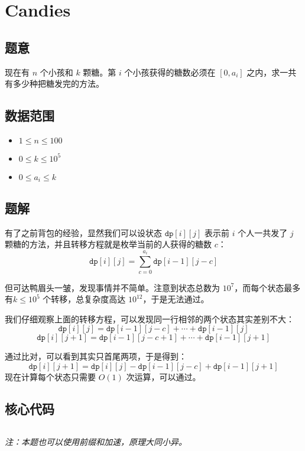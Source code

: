 \section{Candies}
\subsection*{题意}
现在有 $n$ 个小孩和 $k$ 颗糖。第 $i$ 个小孩获得的糖数必须在 $[0,a_i]$ 之内，求一共有多少种把糖发完的方法。

\subsection*{数据范围}
\begin{itemize}
\item $1 \leq n \leq 100$
\item $0 \leq k \leq 10^5$
\item $0 \leq a_i \leq k$
\end{itemize}


\subsection*{题解}

有了之前背包的经验，显然我们可以设状态 ${\texttt{dp}[i][j]}$ 表示前 $i$ 个人一共发了 $j$ 颗糖的方法，并且转移方程就是枚举当前的人获得的糖数 $c$：
$$
{\texttt{dp}[i][j]} = \sum_{c = 0}^{a_i} {\texttt{dp}[i-1][j-c]}
$$

但可达鸭眉头一皱，发现事情并不简单。注意到状态总数为 $10^7$，而每个状态最多有$k \le 10^5$ 个转移，总复杂度高达 $10^{12}$，于是无法通过。

我们仔细观察上面的转移方程，可以发现同一行相邻的两个状态其实差别不大：
$$
{\texttt{dp}[i][j]} = {\texttt{dp}[i-1][j-c]} + \cdots + {\texttt{dp}[i-1][j]}
$$
$$
{\texttt{dp}[i][j+1]} = {\texttt{dp}[i-1][j-c+1]} + \cdots + {\texttt{dp}[i-1][j+1]}
$$

通过比对，可以看到其实只首尾两项，于是得到：
$$
{\texttt{dp}[i][j+1]} = {\texttt{dp}[i][j]} - {\texttt{dp}[i-1][j-c]} + {\texttt{dp}[i-1][j+1]}
$$
现在计算每个状态只需要 $O(1)$ 次运算，可以通过。

\subsection*{核心代码}
\inputminted[linenos,autogobble]{cpp}{./Code/M.cpp}
\emph{注：本题也可以使用前缀和加速，原理大同小异。}

\newpage
